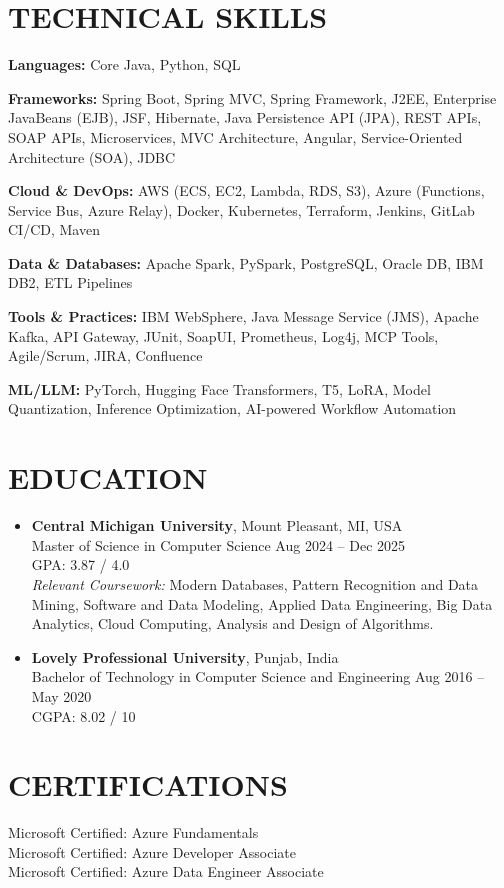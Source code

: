\documentclass[12pt]{article}
\begin{document}
\section*{TECHNICAL SKILLS}

\textbf{Languages:} Core Java, Python, SQL
\vspace{1pt}

\textbf{Frameworks:} Spring Boot, Spring MVC, Spring Framework, J2EE, Enterprise JavaBeans (EJB), JSF, Hibernate, Java Persistence API (JPA), REST APIs, SOAP APIs, Microservices, MVC Architecture, Angular, Service-Oriented Architecture (SOA), JDBC
\vspace{1pt}

\textbf{Cloud \& DevOps:} AWS (ECS, EC2, Lambda, RDS, S3), Azure (Functions, Service Bus, Azure Relay), Docker, Kubernetes, Terraform, Jenkins, GitLab CI/CD, Maven
\vspace{1pt}

\textbf{Data \& Databases:} Apache Spark, PySpark, PostgreSQL, Oracle DB, IBM DB2, ETL Pipelines
\vspace{1pt}

\textbf{Tools \& Practices:} IBM WebSphere, Java Message Service (JMS), Apache Kafka, API Gateway, JUnit, SoapUI, Prometheus, Log4j, MCP Tools, Agile/Scrum, JIRA, Confluence
\vspace{1pt}

\textbf{ML/LLM:} PyTorch, Hugging Face Transformers, T5, LoRA, Model Quantization, Inference Optimization, AI-powered Workflow Automation
\vspace{1pt}

\section*{EDUCATION}

\begin{itemize}[leftmargin=0pt, itemsep=5pt, label=]

\item
\textbf{Central Michigan University}, Mount Pleasant, MI, USA\\
Master of Science in Computer Science \hfill Aug 2024 -- Dec 2025 \\
GPA: 3.87 / 4.0\\
\textit{Relevant Coursework:} Modern Databases, Pattern Recognition and Data Mining, Software and Data Modeling, Applied Data Engineering, Big Data Analytics, Cloud Computing, Analysis and Design of Algorithms.

\item
\textbf{Lovely Professional University}, Punjab, India \\
Bachelor of Technology in Computer Science and Engineering \hfill Aug 2016 -- May 2020 \\
CGPA: 8.02 / 10

\end{itemize}

\section*{CERTIFICATIONS}

Microsoft Certified: Azure Fundamentals \\
Microsoft Certified: Azure Developer Associate \\
Microsoft Certified: Azure Data Engineer Associate
\end{document}
